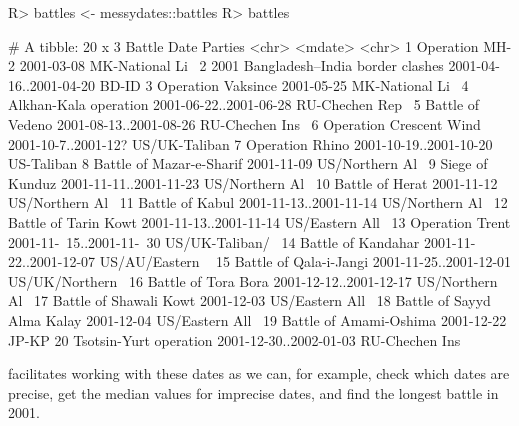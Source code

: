 \documentclass[
]{jss}
\begin{document}
\begin{CodeChunk}
\begin{CodeInput}
R> battles <- messydates::battles
R> battles
\end{CodeInput}
\begin{CodeOutput}
# A tibble: 20 x 3
   Battle                               Date                     Parties        
   <chr>                                <mdate>                  <chr>          
 1 Operation MH-2                       2001-03-08               MK-National Li~
 2 2001 Bangladesh–India border clashes 2001-04-16..2001-04-20   BD-ID          
 3 Operation Vaksince                   2001-05-25               MK-National Li~
 4 Alkhan-Kala operation                2001-06-22..2001-06-28   RU-Chechen Rep~
 5 Battle of Vedeno                     2001-08-13..2001-08-26   RU-Chechen Ins~
 6 Operation Crescent Wind              2001-10-7..2001-12?      US/UK-Taliban  
 7 Operation Rhino                      2001-10-19..2001-10-20   US-Taliban     
 8 Battle of Mazar-e-Sharif             2001-11-09               US/Northern Al~
 9 Siege of Kunduz                      2001-11-11..2001-11-23   US/Northern Al~
10 Battle of Herat                      2001-11-12               US/Northern Al~
11 Battle of Kabul                      2001-11-13..2001-11-14   US/Northern Al~
12 Battle of Tarin Kowt                 2001-11-13..2001-11-14   US/Eastern All~
13 Operation Trent                      2001-11-~15..2001-11-~30 US/UK-Taliban/~
14 Battle of Kandahar                   2001-11-22..2001-12-07   US/AU/Eastern ~
15 Battle of Qala-i-Jangi               2001-11-25..2001-12-01   US/UK/Northern~
16 Battle of Tora Bora                  2001-12-12..2001-12-17   US/Northern Al~
17 Battle of Shawali Kowt               2001-12-03               US/Eastern All~
18 Battle of Sayyd Alma Kalay           2001-12-04               US/Eastern All~
19 Battle of Amami-Oshima               2001-12-22               JP-KP          
20 Tsotsin-Yurt operation               2001-12-30..2002-01-03   RU-Chechen Ins~
\end{CodeOutput}
\end{CodeChunk}

 facilitates working with these dates as we can, for
example, check which dates are precise, get the median values for
imprecise dates, and find the longest battle in 2001.
\end{document}
